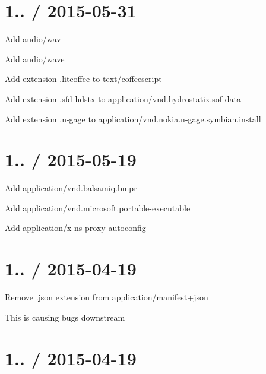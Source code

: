 \section*{1.. / 2015-\/05-\/31 }


\begin{DoxyItemize}
\item Add {\ttfamily audio/wav}
\item Add {\ttfamily audio/wave}
\item Add extension {\ttfamily .litcoffee} to {\ttfamily text/coffeescript}
\item Add extension {\ttfamily .sfd-\/hdstx} to {\ttfamily application/vnd.\+hydrostatix.\+sof-\/data}
\item Add extension {\ttfamily .n-\/gage} to {\ttfamily application/vnd.\+nokia.\+n-\/gage.\+symbian.\+install}
\end{DoxyItemize}

\section*{1.. / 2015-\/05-\/19 }


\begin{DoxyItemize}
\item Add {\ttfamily application/vnd.\+balsamiq.\+bmpr}
\item Add {\ttfamily application/vnd.\+microsoft.\+portable-\/executable}
\item Add {\ttfamily application/x-\/ns-\/proxy-\/autoconfig}
\end{DoxyItemize}

\section*{1.. / 2015-\/04-\/19 }


\begin{DoxyItemize}
\item Remove {\ttfamily .json} extension from {\ttfamily application/manifest+json}
\begin{DoxyItemize}
\item This is causing bugs downstream
\end{DoxyItemize}
\end{DoxyItemize}

\section*{1.. / 2015-\/04-\/19 }


